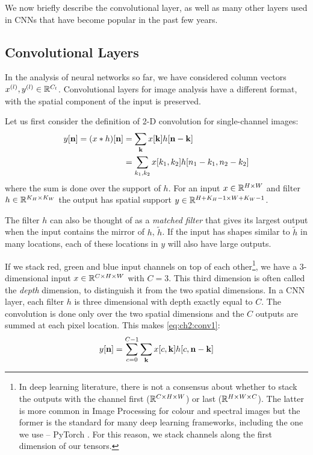 We now briefly describe the convolutional layer, as well as many other layers
used in CNNs that have become popular in the past few years.

\subsection{Convolutional Layers}\label{sec:ch2:conv_layers}
In the analysis of neural networks so far, we have considered column vectors
$x^{(l)},y^{(l)} \in \reals[C_{l}]$. Convolutional layers for image analysis
have a different format, with the spatial component of the input is
preserved.

Let us first consider the definition of 2-D convolution for single-channel
images:
\begin{align}
  y[\nn] = (x\conv h)[\nn] &= \sum_{\kk} x[\kk]h[\nn-\kk] \label{eq:ch2:conv1}\\
                           &= \sum_{k_1, k_2} x[k_1,k_2]h[n_1-k_1, n_2-k_2]
\end{align}
where the sum is done over the support of $h$. For an input $x\in \reals[H\x W]$
and filter $h\in \reals[K_H\x K_W]$ the output has spatial support $y\in
\reals[H+K_H-1 \x W+K_W-1]$.

The filter $h$ can also be thought of as a \emph{matched filter}
that gives its largest output when the input contains the mirror of $h$, $\tilde{h}$. If the input has
shapes similar to $\tilde{h}$ in many locations, each of these locations in $y$ will
also have large outputs.

If we stack red, green and blue input channels on top of each other\footnote{In deep
learning literature, there is not a consensus about whether to stack the outputs
with the channel first ($\reals[C\x H\x W]$) or last ($\reals[H\x W\x C]$). The
latter is more common in Image Processing for colour and spectral images but
the former is the standard for many deep learning frameworks, including the one
we use -- PyTorch \cite{paszke_automatic_2017}. For this reason, we stack
channels along the first dimension of our tensors.}, we have a
3-dimensional input $x \in \reals[C\x H\x W]$ with $C=3$.
This third dimension is often called the \emph{depth} dimension, to distinguish
it from the two spatial dimensions. In a CNN layer, each filter $h$ is three
dimensional with depth exactly equal to $C$. The convolution is
done only over the two spatial dimensions
and the $C$ outputs are summed at each pixel location. This makes
\eqref{eq:ch2:conv1}:
\begin{equation}
  y[\nn] = \sum_{c=0}^{C-1} \sum_{\kk} x[c, \kk]h[c, \nn-\kk]
  \label{eq:ch2:conv2}
\end{equation}

